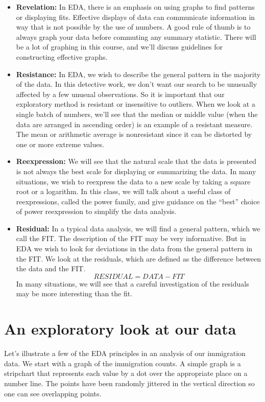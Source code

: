 \documentclass[
]{book}
\begin{document}
\begin{itemize}
\item
  \textbf{Revelation:} In EDA, there is an emphasis on using graphs to find patterns or displaying fits. Effective displays of data can communicate information in way that is not possible by the use of numbers. A good rule of thumb is to always graph your data before commuting any summary statistic. There will be a lot of graphing in this course, and we'll discuss guidelines for constructing effective graphs.
\item
  \textbf{Resistance:} In EDA, we wish to describe the general pattern in the majority of the data. In this detective work, we don't want our search to be unusually affected by a few unusual observations. So it is important that our exploratory method is resistant or insensitive to outliers. When we look at a single batch of numbers, we'll see that the median or middle value (when the data are arranged in ascending order) is an example of a resistant measure. The mean or arithmetic average is nonresistant since it can be distorted by one or more extreme values.
\item
  \textbf{Reexpression:} We will see that the natural scale that the data is presented is not always the best scale for displaying or summarizing the data. In many situations, we wish to reexpress the data to a new scale by taking a square root or a logarithm. In this class, we will talk about a useful class of reexpressions, called the power family, and give guidance on the ``best'' choice of power reexpression to simplify the data analysis.
\item
  \textbf{Residual:} In a typical data analysis, we will find a general pattern, which we call the FIT. The description of the FIT may be very informative. But in EDA we wish to look for deviations in the data from the general pattern in the FIT. We look at the residuals, which are defined as the difference between the data and the FIT.
  \[
  RESIDUAL = DATA - FIT
  \]
  In many situations, we will see that a careful investigation of the residuals may be more interesting than the fit.
\end{itemize}

\hypertarget{an-exploratory-look-at-our-data}{%
\section{An exploratory look at our data}\label{an-exploratory-look-at-our-data}}

Let's illustrate a few of the EDA principles in an analysis of our immigration data. We start with a graph of the immigration counts. A simple graph is a stripchart that represents each value by a dot over the appropriate place on a number line. The points have been randomly jittered in the vertical direction so one can see overlapping points.
\end{document}

